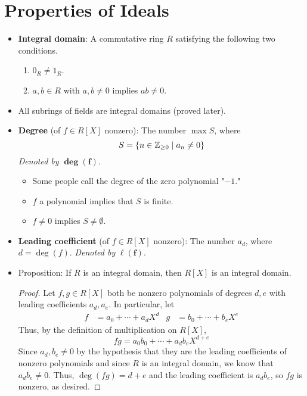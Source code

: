 \documentclass[../notes.tex]{subfiles}
\begin{document}
\section{Properties of Ideals}
\begin{itemize}
    \item {}\textbf{Integral domain}: A commutative ring $R$ satisfying the following two conditions.
    \begin{enumerate}[label={(\alph*)}]
        \item $0_R\neq 1_R$.
        \item $a,b\in R$ with $a,b\neq 0$ implies $ab\neq 0$.
    \end{enumerate}
    \item All subrings of fields are integral domains (proved later).
    \item \textbf{Degree} (of $f\in R[X]$ nonzero): The number $\max S$, where
    \begin{equation*}
        S = \{n\in{\mathbb{Z}_{\geq 0}}\mid a_n\neq 0\}
    \end{equation*}
    \emph{Denoted by} $\bm{\deg(f)}$.
    \begin{itemize}
        \item Some people call the degree of the zero polynomial "$-1$."
        \item $f$ a polynomial implies that $S$ is finite.
        \item $f\neq 0$ implies $S\neq\emptyset$.
    \end{itemize}
    \item \textbf{Leading coefficient} (of $f\in R[X]$ nonzero): The number $a_d$, where $d=\deg(f)$. \emph{Denoted by} $\bm{\ell(f)}$.
    \item Proposition: If $R$ is an integral domain, then $R[X]$ is an integral domain.
    \begin{proof}
        Let $f,g\in R[X]$ both be nonzero polynomials of degrees $d,e$ with leading coefficients $a_d,a_e$. In particular, let
        \begin{align*}
            f &= a_0+\cdots+a_dX^d&
            g &= b_0+\cdots+b_eX^e
        \end{align*}
        Thus, by the definition of multiplication on $R[X]$,
        \begin{equation*}
            fg = a_0b_0+\cdots+a_db_eX^{d+e}
        \end{equation*}
        Since $a_d,b_e\neq 0$ by the hypothesis that they are the leading coefficients of nonzero polynomials and since $R$ is an integral domain, we know that $a_db_e\neq 0$. Thus, $\deg(fg)=d+e$ and the leading coefficient is $a_db_e$, so $fg$ is nonzero, as desired.

\end{proof}
\end{itemize}
\end{document}
